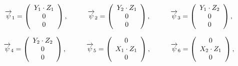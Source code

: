 \begin{equation*}
	\overrightarrow{\psi}_1 = \left(
\begin{array}{c}
		Y_1 \cdot Z_1\\
		0\\
		0\\
\end{array}
	\right),
	\hspace{10mm}
	\overrightarrow{\psi}_2 = \left(
\begin{array}{c}
	Y_2 \cdot Z_1\\
	0\\
	0\\
\end{array}
\right),
	\hspace{10mm}
	\overrightarrow{\psi}_3 = \left(
\begin{array}{c}
	Y_1 \cdot Z_2\\
	0\\
	0\\
\end{array}
\right),
\end{equation*}

\begin{equation*}
	\overrightarrow{\psi}_4 = \left(
	\begin{array}{c}
		Y_2 \cdot Z_2\\
		0\\
		0\\
	\end{array}
	\right),
	\hspace{10mm}
	\overrightarrow{\psi}_5 = \left(
	\begin{array}{c}
		0\\
		X_1 \cdot Z_1\\
		0\\
	\end{array}
	\right),
	\hspace{10mm}
	\overrightarrow{\psi}_6 = \left(
	\begin{array}{c}
		0\\
		X_2 \cdot Z_1\\
		0\\
	\end{array}
	\right),
\end{equation*}


